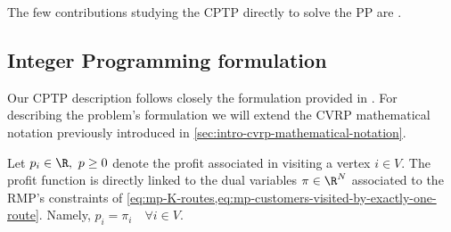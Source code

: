The few contributions studying the CPTP directly to solve the PP
are \cite{jepsen2011, jepsen2014}.

\subsection{Integer Programming formulation}
\label{sec:cptp-integer-programming-formulation}

Our CPTP description follows closely the formulation provided in \textcite{jepsen2014}.
For describing the problem's formulation we will extend the CVRP mathematical notation
previously introduced in \cref{sec:intro-cvrp-mathematical-notation}.

Let $p_i \in \R,\ p \ge 0$ denote the profit associated in visiting a vertex $i \in V$.
The profit function is directly linked to the dual variables $\pi \in \R^N$ associated to
the RMP's constraints of \cref{eq:mp-K-routes,eq:mp-customers-visited-by-exactly-one-route}.
Namely, $p_i = \pi_i \quad \forall i \in V$.

